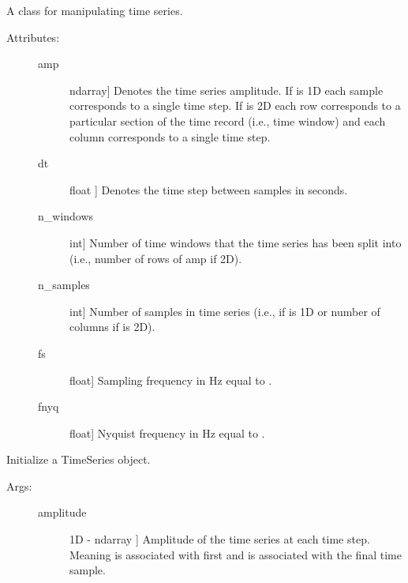 \documentclass[letterpaper,10pt,english]{sphinxmanual}
\begin{document}
\begin{fulllineitems}
\label{\detokenize{index:sigpropy.TimeSeries}}
A class for manipulating time series.
\begin{description}
\item[{Attributes:}] \leavevmode\begin{description}
\item[{amp}] \leavevmode{[}ndarray{]}
Denotes the time series amplitude. If  is 1D each 
sample corresponds to a single time step. If  is 2D 
each row corresponds to a particular section of the time
record (i.e., time window) and each column corresponds to a
single time step.

\item[{dt}] \leavevmode{[}float {]}
Denotes the time step between samples in seconds.

\item[{n\_windows}] \leavevmode{[}int{]}
Number of time windows that the time series has been split
into (i.e., number of rows of amp if 2D).

\item[{n\_samples}] \leavevmode{[}int{]}
Number of samples in time series (i.e.,  if 
is 1D or number of columns if  is 2D).

\item[{fs}] \leavevmode{[}float{]}
Sampling frequency in Hz equal to .

\item[{fnyq}] \leavevmode{[}float{]}
Nyquist frequency in Hz equal to .

\end{description}

\end{description}

\begin{fulllineitems}
\label{\detokenize{index:sigpropy.TimeSeries.__init__}}
Initialize a TimeSeries object.
\begin{description}
\item[{Args:}] \leavevmode\begin{description}
\item[{amplitude}] \leavevmode{[}1D - ndarray {]}
Amplitude of the time series at each time step. Meaning 
 is associated with first and 
 is associated with the final time 
sample.


\end{description}
\end{description}
\end{fulllineitems}
\end{fulllineitems}
\end{document}
